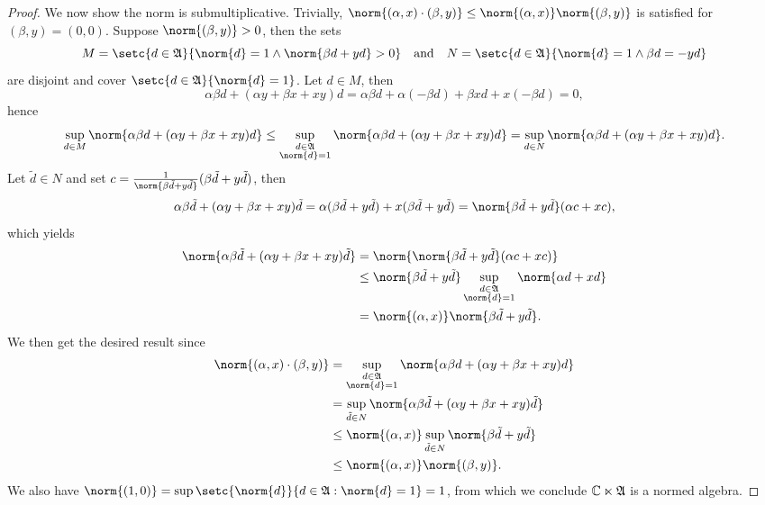 \begin{proof}
    We now show the norm is submultiplicative. Trivially, \(\norm{(\alpha, x)\cdot(\beta,y)} \leq \norm{(\alpha, x)}\norm{(\beta, y)}\) is satisfied for \((\beta,y) = (0,0)\). Suppose \(\norm{(\beta,y)} > 0\), then the sets
    \begin{equation*}
        M = \setc{d \in \algebra{A}}{\norm{d} = 1 \land \norm{\beta d + yd} > 0}
        \quad\text{and}\quad
        N = \setc{d \in \algebra{A}}{\norm{d} = 1 \land \beta d = - yd}
    \end{equation*}
    are disjoint and cover \(\setc{d \in \algebra{A}}{\norm{d} = 1}\). Let \(d \in M\), then
    \begin{equation*}
        \alpha \beta d + (\alpha y + \beta x + xy)d = \alpha \beta d + \alpha (-\beta d) + \beta x d + x(-\beta d) = 0,
    \end{equation*}
    hence
    \begin{equation*}
        \sup_{d \in M}{\norm{\alpha \beta d + (\alpha y + \beta x + xy)d}} \leq \sup_{\substack{d \in \algebra{A}\\\norm{d} = 1}}{\norm{\alpha \beta d + (\alpha y + \beta x + xy)d}} = \sup_{d \in N}{\norm{\alpha \beta d + (\alpha y + \beta x + xy)d}}.
    \end{equation*}
    Let \(\tilde{d} \in N\) and set \(c = \frac{1}{\norm{\beta \tilde{d} + y \tilde{d}}}(\beta \tilde{d} + y \tilde{d})\), then
    \begin{equation*}
        \alpha \beta \tilde{d} + (\alpha y + \beta x + xy)\tilde{d} = \alpha(\beta \tilde{d} + y \tilde{d}) + x(\beta \tilde{d} + y \tilde{d}) =  \norm{\beta \tilde{d} + y \tilde{d}}(\alpha c + xc),
    \end{equation*}
    which yields
    \begin{align*}
        \norm{\alpha \beta \tilde{d} + (\alpha y + \beta x + xy)\tilde{d}}
        &= \norm{\norm{\beta \tilde{d} + y \tilde{d}}(\alpha c + xc)}\\
        &\leq \norm{\beta \tilde{d} + y \tilde{d}} \sup_{\substack{d \in \algebra{A}\\\norm{d}=1}}{\norm{\alpha d + xd}}\\
        &= \norm{(\alpha,x)}\norm{\beta \tilde{d} + y \tilde{d}}.
    \end{align*}
    We then get the desired result since
    \begin{align*}
        \norm{(\alpha, x)\cdot(\beta, y)} &= \sup_{\substack{d \in \algebra{A}\\\norm{d} = 1}}{\norm{\alpha \beta d + (\alpha y + \beta x + xy)d}}\\
                                          &= \sup_{\tilde{d} \in N}{\norm{\alpha \beta \tilde{d} + (\alpha y + \beta x + xy)\tilde{d}}}\\
                                          &\leq \norm{(\alpha,x)} \sup_{\tilde{d} \in N}{\norm{\beta \tilde{d} + y \tilde{d}}}\\
                                          &\leq \norm{(\alpha, x)}\norm{(\beta,y)}.
    \end{align*}
    We also have \(\norm{(1,0)} = \sup{\setc{\norm{d}}{d \in \algebra{A} : \norm{d} = 1}} = 1\), from which we conclude \(\mathbb{C} \ltimes \mathfrak{A}\) is a normed algebra.


\end{proof}
